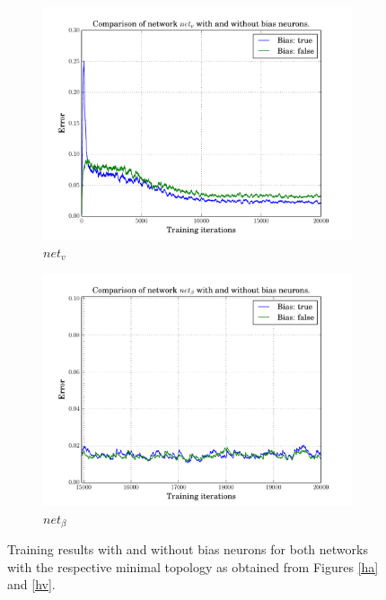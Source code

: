 \documentclass[10pt,a4paper,DIV=11]{scrreprt}
\begin{document}
\begin{figure}[H]
\centering
\begin{subfigure}{\textwidth}
  \centering
  \includegraphics[width=0.8\linewidth]{files/supervised/bv.pdf}
  \caption{$net_v$}
  \label{fig:ha}
\end{subfigure}%
\newline
\begin{subfigure}{\textwidth}
  \centering
  \includegraphics[width=0.8\linewidth]{files/supervised/ba.pdf}
  \caption{$net_\beta$}
  \label{fig:haend}
\end{subfigure}
\newline
\caption{Training results with and without bias neurons for both networks with
         the respective minimal topology as obtained from Figures \ref{ha} and  \ref{hv}.}
\label{fig:hvend}
\end{figure}
\end{document}
